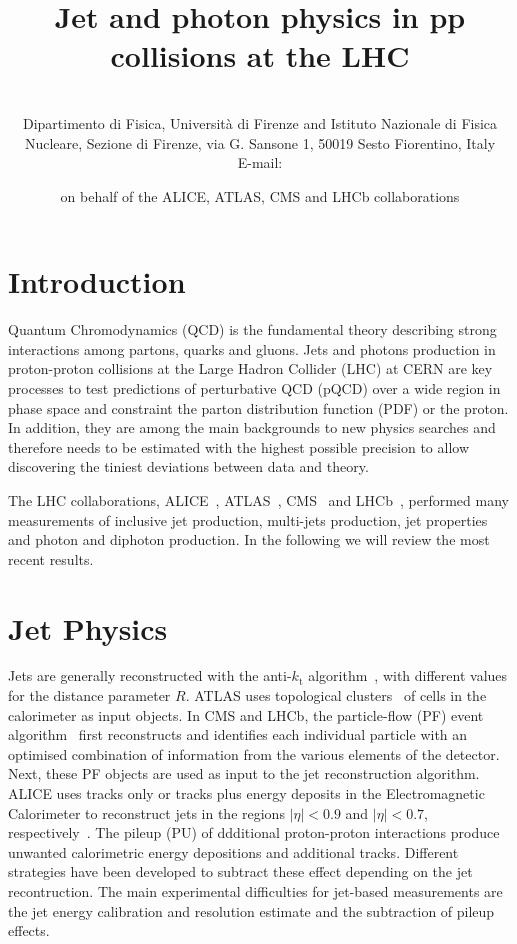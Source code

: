 \documentclass{PoS}
\title{Jet and photon physics in pp collisions at the LHC}
\author{\speaker{ Vitaliano Ciulli } %
\\ Dipartimento di Fisica, Universit\`a di Firenze and Istituto
Nazionale di Fisica Nucleare, Sezione di Firenze, via G. Sansone 1, 50019 Sesto Fiorentino, Italy \\ E-mail:
\email{vitaliano.ciulli@fi.infn.it}} \author{on behalf of the ALICE, ATLAS, CMS and LHCb collaborations}
\providecommand{\kts}{\ensuremath{k_{\mathrm{t}}}\xspace}
\begin{document}
\section{Introduction}

Quantum Chromodynamics (QCD) is the fundamental theory describing strong interactions among partons, \ie quarks and
gluons. Jets and photons production in proton-proton collisions at the Large Hadron Collider (LHC) at CERN are key processes to test predictions of
perturbative QCD (pQCD) over a wide region in phase space and constraint the parton distribution function (PDF) or the
proton. In addition, they are among the main backgrounds to new physics searches and therefore needs to be estimated with the
highest possible precision to allow discovering the tiniest deviations between data and theory.

The LHC collaborations, ALICE~\cite{Aamodt:2008zz}, ATLAS~\cite{Aad:2008zzm}, CMS~\cite{Chatrchyan:2008aa} and LHCb~\cite{Alves:2008zz}, performed many
measurements of inclusive jet production, multi-jets production, jet properties and photon and diphoton production. 
In the following we will review the most recent results.

\section{Jet Physics}

Jets are generally reconstructed with the anti-\kts algorithm~\cite{Cacciari:2008gp}, with different values for the distance parameter $R$.
ATLAS uses topological clusters~\cite{Lampl:2008zz} of cells in the calorimeter as input objects. 
In CMS and LHCb, the particle-flow (PF) event
algorithm~\cite{CMS:2009nxa,Aaij:2013nxa} first reconstructs and identifies each individual particle with an optimised
combination of information from the various elements of the detector. Next, these PF objects are used as input to the jet
reconstruction algorithm. ALICE uses tracks only or tracks plus energy deposits
in the Electromagnetic Calorimeter to reconstruct jets in the regions
$|\eta|<0.9$ and $|\eta|<0.7$, respectively~\cite{Abelev:2013fn}.
The pileup (PU) of ddditional proton-proton interactions produce unwanted calorimetric energy depositions and additional
tracks. Different strategies have been developed to subtract these effect depending on the jet recontruction.
The main experimental difficulties for jet-based measurements are the jet energy calibration and resolution estimate and the subtraction of pileup
effects. 
\end{document}
